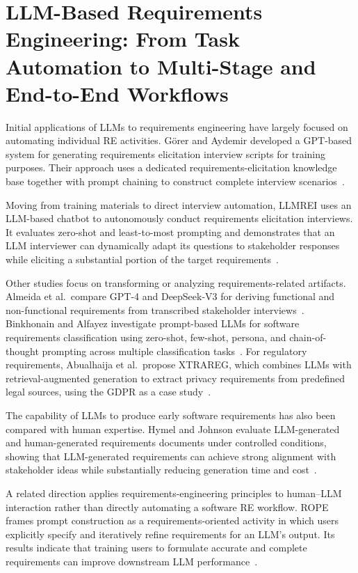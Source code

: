\section{LLM-Based Requirements Engineering: From Task Automation to Multi-Stage and End-to-End Workflows}
\label{sec:rw-llm-re}

Initial applications of LLMs to requirements engineering have largely focused on automating individual RE activities. Görer and Aydemir developed a GPT-based system for generating requirements elicitation interview scripts for training purposes. Their approach uses a dedicated requirements-elicitation knowledge base together with prompt chaining to construct complete interview scenarios~\cite{gorer2024gpt}.

Moving from training materials to direct interview automation, LLMREI uses an LLM-based chatbot to autonomously conduct requirements elicitation interviews. It evaluates zero-shot and least-to-most prompting and demonstrates that an LLM interviewer can dynamically adapt its questions to stakeholder responses while eliciting a substantial portion of the target requirements~\cite{korn2025llmrei}.

Other studies focus on transforming or analyzing requirements-related artifacts. Almeida et al.\ compare GPT-4 and DeepSeek-V3 for deriving functional and non-functional requirements from transcribed stakeholder interviews~\cite{almeida2025elicitation}. Binkhonain and Alfayez investigate prompt-based LLMs for software requirements classification using zero-shot, few-shot, persona, and chain-of-thought prompting across multiple classification tasks~\cite{binkhonain2025prompts}. For regulatory requirements, Abualhaija et al.\ propose XTRAREG, which combines LLMs with retrieval-augmented generation to extract privacy requirements from predefined legal sources, using the GDPR as a case study~\cite{abualhaija2025llm}.

The capability of LLMs to produce early software requirements has also been compared with human expertise. Hymel and Johnson evaluate LLM-generated and human-generated requirements documents under controlled conditions, showing that LLM-generated requirements can achieve strong alignment with stakeholder ideas while substantially reducing generation time and cost~\cite{hymel2025analysis}.

A related direction applies requirements-engineering principles to human--LLM interaction rather than directly automating a software RE workflow. ROPE frames prompt construction as a requirements-oriented activity in which users explicitly specify and iteratively refine requirements for an LLM's output. Its results indicate that training users to formulate accurate and complete requirements can improve downstream LLM performance~\cite{ma2025rope}.

